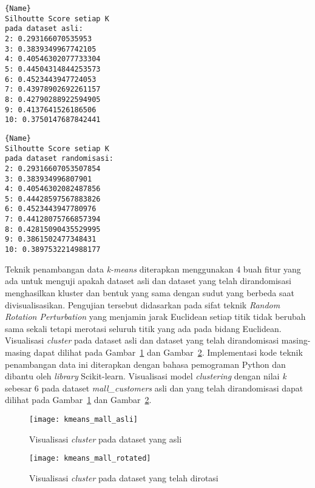 \noindent\begin{minipage}{.46\textwidth}
\begin{lstlisting}[caption=Silhoutte Score Asli,frame=tlrb, label=mall_customers_siluet_asli]{Name}
Silhoutte Score setiap K
pada dataset asli: 
2: 0.293166070535953
3: 0.3839349967742105
4: 0.40546302077733304
5: 0.44504314844253573
6: 0.4523443947724053
7: 0.43978902692261157
8: 0.42790288922594905
9: 0.4137641526186506
10: 0.3750147687842441
\end{lstlisting}
\end{minipage}\hfill
\begin{minipage}{.46\textwidth}
\begin{lstlisting}[caption=Silhoutte Score Randomisasi,frame=tlrb, label=mall_customers_siluet_randomisasi]{Name}
Silhoutte Score setiap K
pada dataset randomisasi: 
2: 0.29316607053507854
3: 0.383934996807901
4: 0.40546302082487856
5: 0.44428597567883826
6: 0.4523443947780976
7: 0.44128075766857394
8: 0.42815090435529995
9: 0.3861502477348431
10: 0.3897532214988177
\end{lstlisting}
\end{minipage}

Teknik penambangan data \textit{k-means} diterapkan menggunakan 4 buah fitur yang ada untuk menguji apakah dataset asli dan dataset yang telah dirandomisasi menghasilkan kluster dan bentuk yang sama dengan sudut yang berbeda saat divisualisasikan. Pengujian tersebut didasarkan pada sifat teknik \textit{Random Rotation Perturbation} yang menjamin jarak Euclidean setiap titik tidak berubah sama sekali tetapi merotasi seluruh titik yang ada pada bidang Euclidean. Visualisasi \textit{cluster} pada dataset asli dan dataset yang telah dirandomisasi masing-masing dapat dilihat pada Gambar~\ref{fig:kmeans_mall_asli} dan Gambar~\ref{fig:kmeans_mall_rotated}. Implementasi kode teknik penambangan data ini diterapkan dengan bahasa pemograman Python dan dibantu oleh \textit{library} Scikit-learn. Visualisasi model \textit{clustering} dengan nilai \textit{k} sebesar 6 pada dataset \textit{mall\_customers} asli dan yang telah dirandomisasi dapat dilihat pada Gambar~\ref{fig:kmeans_mall_asli} dan Gambar~\ref{fig:kmeans_mall_rotated}. 

\begin{figure}
	\centering
	\texttt{[image: kmeans\_mall\_asli]}
	\caption{Visualisasi \textit{cluster} pada dataset yang asli}
	\label{fig:kmeans_mall_asli}
\end{figure}

\begin{figure}
	\centering
	\texttt{[image: kmeans\_mall\_rotated]}
	\caption{Visualisasi \textit{cluster} pada dataset yang telah dirotasi}
	\label{fig:kmeans_mall_rotated}
\end{figure}

